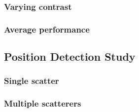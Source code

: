 \documentclass{IEEEtran}
\begin{document}

			
			\subsubsection{Varying contrast}\label{sec:results:shape:varying}
			
			\subsubsection{Average performance}\label{sec:results:shape:average}
		
		\subsection{Position Detection Study}\label{sec:results:position}
		
			\subsubsection{Single scatter}\label{sec:results:position:single}
			
			\subsubsection{Multiple scatterers}\label{sec:results:position:multiple}
			
\end{document}
